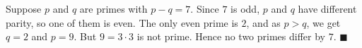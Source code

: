 Suppose $p$ and $q$ are primes with $p-q=7$. Since $7$ is odd, $p$ and $q$ have different parity, so one of them is even. The only even prime is $2$, and as $p>q$, we get $q=2$ and $p=9$. But $9=3\cdot3$ is not prime. Hence no two primes differ by $7$. $\blacksquare$
